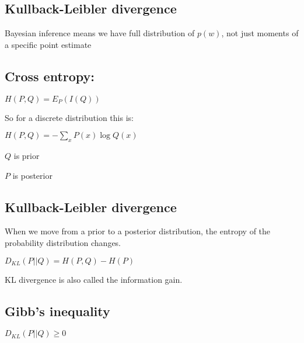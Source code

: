 
\subsection{Kullback-Leibler divergence}

Bayesian inference means we have full distribution of \(p(w)\), not just moments of a specific point estimate

\subsection{Cross entropy:}

\(H(P,Q)=E_P(I(Q))\)

So for a discrete distribution this is:

\(H(P,Q)=-\sum_x P(x)\log Q(x)\)

\(Q\) is prior

\(P\) is posterior

\subsection{Kullback-Leibler divergence}

When we move from a prior to a posterior distribution, the entropy of the probability distribution changes.

\(D_{KL}(P||Q)=H(P,Q)-H(P)\)

KL divergence is also called the information gain.

\subsection{Gibb's inequality}

\(D_{KL}(P||Q)\ge 0\)

